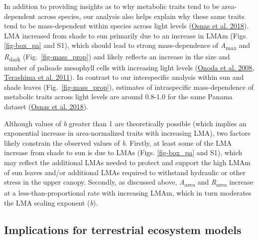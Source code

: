 \documentclass[
  12pt,
  letterpaper,
  DIV=11,
  numbers=noendperiod]{scrartcl}
\begin{document}
In addition to providing insights as to why metabolic traits tend to be
area-dependent across species, our analysis also helps explain why these
same traits tend to be mass-dependent within species across light levels
(\protect\hyperlink{ref-Osnas2018}{Osnas et al. 2018}). LMA increased
from shade to sun primarily due to an increase in LMAm (Figs.
\ref{fig-box_pa} and S1), which should lead to strong mass-dependence of
\emph{A}\textsubscript{max} and \emph{R}\textsubscript{dark}
(Fig.~\ref{fig-mass_prop}) and likely reflects an increase in the size
and number of palisade mesophyll cells with increasing light levels
(\protect\hyperlink{ref-Onoda2008}{Onoda et al. 2008},
\protect\hyperlink{ref-Terashima2011}{Terashima et al. 2011}). In
contrast to our interspecific analysis within sun and shade leaves
(Fig.~\ref{fig-mass_prop}), estimates of intraspecific mass-dependence
of metabolic traits across light levels are around 0.8-1.0 for the same
Panama dataset (\protect\hyperlink{ref-Osnas2018}{Osnas et al. 2018}).

Although values of \emph{b} greater than 1 are theoretically possible
(which implies an exponential increase in area-normalized traits with
increasing LMA), two factors likely constrain the observed values of
\emph{b}. Firstly, at least some of the LMA increase from shade to sun
is due to LMAs (Figs. \ref{fig-box_pa} and S1), which may reflect the
additional LMAs needed to protect and support the high LMAm of sun
leaves and/or additional LMAs required to withstand hydraulic or other
stress in the upper canopy. Secondly, as discussed above,
\emph{A}\textsubscript{area} and \emph{R}\textsubscript{area} increase
at a less-than-proportional rate with increasing LMAm, which in turn
moderates the LMA scaling exponent (\emph{b}).

\hypertarget{implications-for-terrestrial-ecosystem-models}{%
\subsection{Implications for terrestrial ecosystem
models}\label{implications-for-terrestrial-ecosystem-models}}
\end{document}
